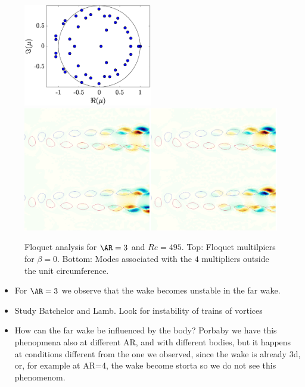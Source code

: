 \begin{figure}
  \centering
  \includegraphics[width=0.5\textwidth]{./fig/AR3/mult_Re495_beta0.eps}
  \includegraphics[width=1.0\textwidth]{./fig/AR3/Floquet_modes_beta_0_Re495.png}
  \caption{Floquet analysis for $\AR=3$ and $Re=495$. Top: Floquet multilpiers for $\beta = 0$. Bottom: Modes associated with the $4$ multipliers outside the unit circumference.}
  \label{fig:AR3_Stab}
\end{figure}

\begin{itemize}
  \item For $\AR=3$ we observe that the wake becomes unstable in the far wake.
  \item Study Batchelor and Lamb. Look for instability of trains of vortices
  \item How can the far wake be influenced by the body? Porbaby we have this phenopmena also at different AR, and with different bodies, but it happens at conditions different from the one we observed, since the wake is already 3d, or, for example at AR=4, the wake become storta so we do not see this phenomenom.
\end{itemize}
